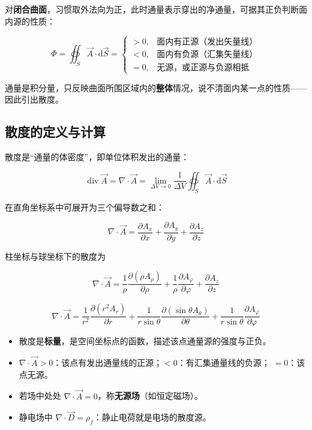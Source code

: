 对\textbf{闭合曲面}，习惯取外法向为正，此时通量表示穿出的净通量，可据其正负判断面内源的性质：
\begin{formulaBox}
\[
\Phi=\oiint_S\vec{A}\cdot\mathrm{d}\vec{S}
=\begin{cases}
>0, & \text{面内有正源（发出矢量线）}\\
<0, & \text{面内有负源（汇集矢量线）}\\
=0, & \text{无源，或正源与负源相抵}
\end{cases}
\]
\end{formulaBox}

通量是积分量，只反映曲面所围区域内的\textbf{整体}情况，说不清面内某一点的性质——因此引出散度。

\subsection{散度的定义与计算}

散度是“通量的体密度”，即单位体积发出的通量：
\begin{formulaBox}
\[
\operatorname{div}\vec{A}=\nabla\cdot\vec{A}
=\lim_{\Delta V\to 0}\frac{1}{\Delta V}\oiint_S\vec{A}\cdot\mathrm{d}\vec{S}
\]
\end{formulaBox}

在直角坐标系中可展开为三个偏导数之和：
\begin{formulaBox}
\[
\nabla\cdot\vec{A}=\frac{\partial A_x}{\partial x}+\frac{\partial A_y}{\partial y}+\frac{\partial A_z}{\partial z}
\]
\end{formulaBox}

柱坐标与球坐标下的散度为
\begin{formulaBox}
\[
\nabla\cdot\vec{A}=\frac{1}{\rho}\frac{\partial(\rho A_\rho)}{\partial\rho}
+\frac{1}{\rho}\frac{\partial A_\varphi}{\partial\varphi}+\frac{\partial A_z}{\partial z}
\]
\end{formulaBox}
\begin{formulaBox}
\[
\nabla\cdot\vec{A}=\frac{1}{r^2}\frac{\partial(r^2A_r)}{\partial r}
+\frac{1}{r\sin\theta}\frac{\partial(\sin\theta A_\theta)}{\partial\theta}
+\frac{1}{r\sin\theta}\frac{\partial A_\varphi}{\partial\varphi}
\]
\end{formulaBox}

\begin{itemize}
    \item 散度是\textbf{标量}，是空间坐标点的函数，描述该点通量源的强度与正负。
    \item $\nabla\cdot\vec{A}>0$：该点有发出通量线的正源；$<0$：有汇集通量线的负源；
    $=0$：该点无源。
    \item 若场中处处 $\nabla\cdot\vec{A}=0$，称\textbf{无源场}（如恒定磁场）。
    \item 静电场中 $\nabla\cdot\vec{D}=\rho_f$：静止电荷就是电场的散度源。
\end{itemize}

